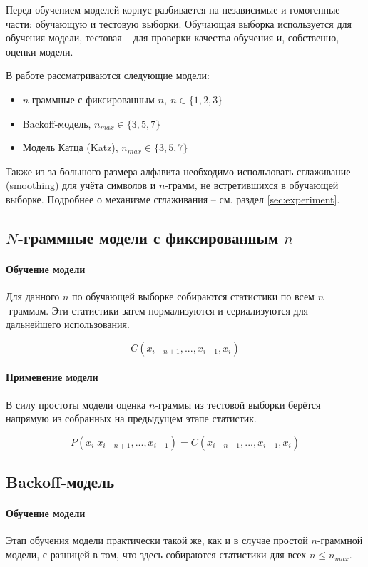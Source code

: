 \documentclass[14pt,russian]{extreport}
\theoremstyle{definition}
\begin{document}
Перед обучением моделей корпус разбивается на независимые и гомогенные части: обучающую и тестовую выборки. Обучающая выборка используется для обучения модели, тестовая -- для проверки качества обучения и, собственно, оценки модели.

В работе рассматриваются следующие модели: 

\begin{itemize}
	\item $n$-граммные с фиксированным $n,\ n \in \{1,2,3\}$
	
	\item Backoff-модель, $n_{max} \in \{ 3, 5, 7 \}$
	
	\item Модель Катца (Katz),  $n_{max} \in \{ 3, 5, 7 \}$
\end{itemize}

Также из-за большого размера алфавита необходимо использовать сглаживание (smoothing) для учёта символов и $n$-грамм, не встретившихся в обучающей выборке. Подробнее о механизме сглаживания -- см. раздел \ref{sec:experiment}.

\subsection{ $N$-граммные модели с фиксированным $n$ }

\paragraph{ Обучение модели } Для данного $n$ по обучающей выборке собираются статистики по всем $n$-граммам. Эти статистики затем нормализуются и сериализуются для дальнейшего использования.

$$ C(x_{i - n + 1}, ..., x_{i - 1}, x_i) $$ 

\paragraph{ Применение модели } В силу простоты модели оценка $n$-граммы из тестовой выборки берётся напрямую из собранных на предыдущем этапе статистик.

$$ P(x_i | x_{i - n + 1}, ..., x_{i - 1}) = C(x_{i - n + 1}, ..., x_{i - 1}, x_i) $$

\subsection{ Backoff-модель } 

\paragraph{ Обучение модели } Этап обучения модели практически такой же, как и в случае простой $n$-граммной модели, с разницей в том, что здесь собираются статистики для всех $n \leq n_{max}$.
\end{document}
